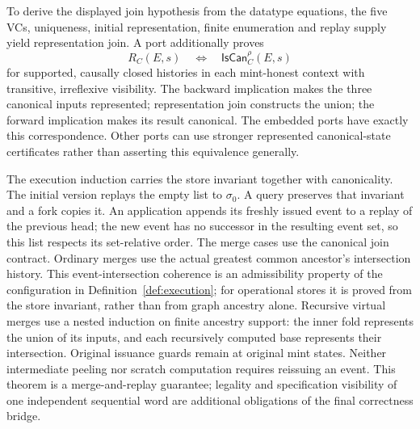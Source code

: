 To derive the displayed join hypothesis from the datatype equations, the five VCs, uniqueness, initial representation, finite enumeration
and replay supply yield representation join. A port additionally proves
\[
 R_C(E,s)\quad\Longleftrightarrow\quad\mathsf{IsCan}^{\rho}_C(E,s)
\]
for supported, causally closed histories in each mint-honest context
with transitive, irreflexive visibility. The backward implication makes the
three canonical inputs represented; representation join constructs the union;
the forward implication makes its result canonical. The embedded ports have
exactly this correspondence. Other ports can use stronger represented
canonical-state certificates rather than asserting this equivalence generally.

The execution induction carries the store invariant together with canonicality.
The initial version replays the empty list to $\sigma_0$. A query preserves
that invariant and a fork copies it. An application appends its freshly
issued event to a replay of the previous head; the new event has no successor
in the resulting event set, so this list respects its set-relative order.
The merge cases use the canonical join contract.
Ordinary merges use the actual greatest common ancestor's intersection history.
This event-intersection coherence is an admissibility property of the
configuration in Definition~\ref{def:execution}; for operational stores it is
proved from the store invariant, rather than from graph ancestry alone.
Recursive virtual merges use a nested induction on finite ancestry support:
the inner fold represents the union of its inputs, and each recursively
computed base represents their intersection. Original issuance guards remain
at original mint states. Neither intermediate peeling nor scratch computation
requires reissuing an event. This theorem is a merge-and-replay guarantee;
legality and specification visibility of one independent sequential word are
additional obligations of the final correctness bridge.
